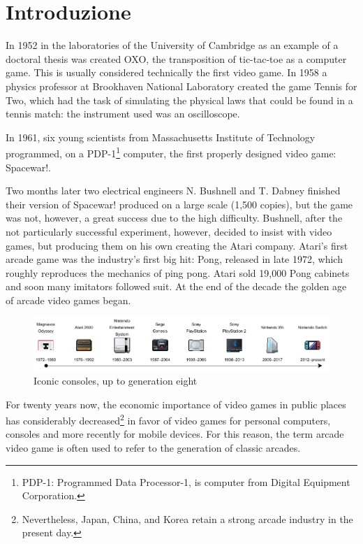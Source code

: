%
%

\chapter{Introduzione}
\label{cap:Introduzione}

In 1952 in the laboratories of the University of Cambridge as an example of a doctoral thesis was created OXO, the transposition of tic-tac-toe as a computer game. This is usually considered technically the first video game. In 1958 a physics professor at Brookhaven National Laboratory created the game Tennis for Two, which had the task of simulating the physical laws that could be found in a tennis match: the instrument used was an oscilloscope.

In 1961, six young scientists from Massachusetts Institute of Technology programmed, on a PDP-1\footnote{PDP-1: Programmed Data Processor-1, is computer from Digital Equipment Corporation.} computer, the first properly designed video game: Spacewar!.

Two months later two electrical engineers N. Bushnell and T. Dabney finished their version of Spacewar! produced on a large scale (1,500 copies), but the game was not, however, a great success due to the high difficulty. Bushnell, after the not particularly successful experiment, however, decided to insist with video games, but producing them on his own creating the Atari company. Atari's first arcade game was the industry's first big hit: Pong, released in late 1972, which roughly reproduces the mechanics of ping pong. Atari sold 19,000 Pong cabinets and soon many imitators followed suit. At the end of the decade the golden age of arcade video games began.

\begin{figure}[H]
	\includegraphics[width=\linewidth]{immagini/consoles_history}
	\caption{Iconic consoles, up to generation eight}
	\label{fig:consoles_history}
\end{figure}

For twenty years now, the economic importance of video games in public places has considerably decreased\footnote{Nevertheless, Japan, China, and Korea retain a strong arcade industry in the present day.} in favor of video games for personal computers, consoles and more recently for mobile devices. For this reason, the term arcade video game is often used to refer to the generation of classic arcades\cite{High_Score}.

